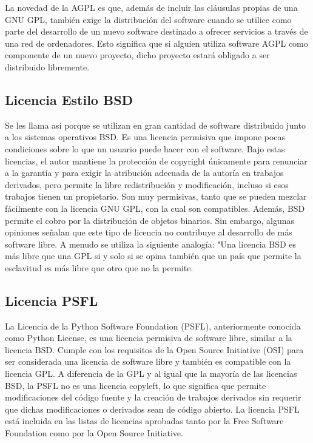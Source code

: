				La novedad de la AGPL es que, además de incluir las cláusulas propias de una GNU GPL, también exige la distribución del software cuando se utilice como parte del desarrollo de un nuevo software destinado a ofrecer servicios a través de una red de ordenadores. Esto significa que si alguien utiliza software AGPL como componente de un nuevo proyecto, dicho proyecto estará obligado a ser distribuido libremente.\par
				
			\subsection{Licencia Estilo BSD}\label{bsd}
			
				Se les llama así porque se utilizan en gran cantidad de software distribuido junto a los sistemas operativos BSD. Es una licencia permisiva que impone pocas condiciones sobre lo que un usuario puede hacer con el software. Bajo estas licencias, el autor mantiene la protección de copyright únicamente para renunciar a la garantía y para exigir la atribución adecuada de la autoría en trabajos derivados, pero permite la libre redistribución y modificación, incluso si esos trabajos tienen un propietario. Son muy permisivas, tanto que se pueden mezclar fácilmente con la licencia GNU GPL, con la cual son compatibles. Además, BSD permite el cobro por la distribución de objetos binarios. Sin embargo, algunas opiniones señalan que este tipo de licencia no contribuye al desarrollo de más software libre. A menudo se utiliza la siguiente analogía: "Una licencia BSD es más libre que una GPL si y solo si se opina también que un país que permite la esclavitud es más libre que otro que no la permite.\par
			
			\subsection{Licencia PSFL}\label{psfl}
			
				La Licencia de la Python Software Foundation (PSFL), anteriormente conocida como Python License, es una licencia permisiva de software libre, similar a la licencia BSD. Cumple con los requisitos de la Open Source Initiative (OSI) para ser considerada una licencia de software libre y también es compatible con la licencia GPL. A diferencia de la GPL y al igual que la mayoría de las licencias BSD, la PSFL no es una licencia copyleft, lo que significa que permite modificaciones del código fuente y la creación de trabajos derivados sin requerir que dichas modificaciones o derivados sean de código abierto. La licencia PSFL está incluida en las listas de licencias aprobadas tanto por la Free Software Foundation como por la Open Source Initiative.\par
				
